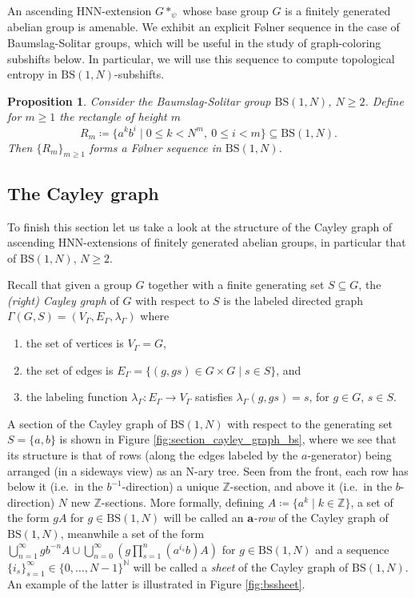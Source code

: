 \documentclass[cupthm,crop,info]{CUP-JNL-ETS}%
\theoremstyle{cupplain}
\newtheorem{proposition}[theorem]{Proposition}
\theoremstyle{cupdefinition}
\theoremstyle{cupremark}
\theoremstyle{cupproof}
\numberwithin{equation}{section}
\newcommand{\BS}[1][N]{\mathrm{BS}(1,#1)}
\begin{document}
An ascending HNN-extension $G*_{\psi}$ whose base group $G$ is a finitely generated abelian group is amenable. We exhibit an explicit F\o lner sequence in the case of Baumslag-Solitar groups, which will be useful in the study of graph-coloring subshifts below. In particular, we will use this sequence to compute topological entropy in $\BS$-subshifts.


\begin{proposition}\label{prop:rectangles_and_folner} Consider the Baumslag-Solitar group $\BS$, $N\ge 2$. Define for $m\ge 1$ the \textit{rectangle of height $m$}
	$$
	R_m\coloneqq \{a^kb^i\mid 0\le k<N^m, \ 0\le i<m  \}\subseteq \BS.
	$$
	Then $\{R_m\}_{m\ge 1}$ forms a F\o lner sequence in $\BS$.
\end{proposition}




\subsection{The Cayley graph }

To finish this section let us take a look at the structure of the Cayley graph of ascending HNN-extensions of finitely generated abelian groups, in particular that of $\BS$, $N\ge 2$. 

Recall that given a group $G$ together with a finite generating set $S\subseteq G$, the \textit{(right) Cayley graph} of $G$ with respect to $S$ is the labeled directed graph  $\Gamma(G,S)=(V_{\Gamma},E_{\Gamma},\lambda_{\Gamma})$ where
\begin{enumerate}
	\item the set of vertices is $V_\Gamma=G$, 
	\item the set of edges is $E_{\Gamma}=\{(g,gs)\in G\times G\mid s\in S\}$, and
	\item the labeling function $\lambda_{\Gamma}:E_{\Gamma}\to V_{\Gamma}$ satisfies $\lambda_{\Gamma}(g,gs)=s$, for $g\in G$, $s\in S$.
\end{enumerate}


A section of the Cayley graph of $\BS$ with respect to the generating set $S=\{a,b\}$ is shown in Figure \ref{fig:section_cayley_graph_bs}, where we see that its structure is that of rows (along the edges labeled by the $a$-generator) being arranged (in a sideways view) as an N-ary tree. Seen from the front, each row has below it (i.e.\ in the $b^{-1}$-direction) a unique $\mathbb{Z}$-section, and above it (i.e.\ in the $b$-direction) $N$ new $\mathbb{Z}$-sections. More formally, defining $A\coloneqq\{a^k \mid k\in\mathbb{Z}\}$, a set of the form $gA$ for $g\in \BS$ will be called an $\mathbf{a}$\textit{-row} of the Cayley graph of $\BS$, meanwhile a set of the form $\displaystyle\bigcup_{n=1}^{\infty}gb^{-n}A  \cup\bigcup_{n=0}^\infty\left( g\prod_{s=1}^{n}(a^{i_s}b)A \right)$ for $g\in \BS$ and a sequence $\{i_s\}_{s=1}^{\infty}\in \{0,\ldots,N-1\}^{\mathbb{N}}$ will be called a \textit{sheet} of the Cayley graph of $\BS$. An example of the latter is illustrated in Figure \ref{fig:bssheet}. 
\end{document}
